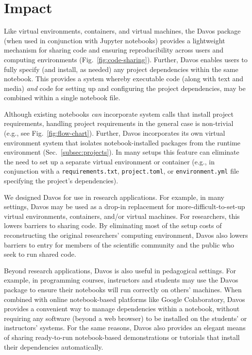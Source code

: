 \documentclass[preprint,12pt,a4paper]{elsarticle}
\begin{document}
\section{Impact}

Like virtual environments, containers, and virtual machines, the
Davos package (when used in conjunction with Jupyter
notebooks) provides a light\-weight mechanism for sharing code and
ensuring reproducibility across users and computing environments
(Fig.~\ref{fig:code-sharing}). Further, Davos enables users
to fully specify (and install, as needed) any project dependencies
within the same notebook. This provides a system whereby executable
code (along with text and media) \textit{and} code for setting up and
configuring the project dependencies, may be combined within a single
notebook file.

Although existing notebooks \textit{can} incorporate system calls that install
project requirements, handling project requirements in the general case is
non-trivial (e.g., see Fig.~\ref{fig:flow-chart}). Further, Davos
incorporates its own virtual environment system that isolates
notebook-installed packages from the runtime environment
(Sec.~\ref{subsec:projects}). In many setups this feature can eliminate the
need to set up a separate virtual environment or container (e.g., in
conjunction with a \texttt{requirements.txt}, \texttt{project.toml}, or
\texttt{environment.yml} file specifying the project's dependencies).

We designed Davos for use in research applications. For
example, in many settings, Davos may be used as a drop-in
replacement for more-difficult-to-set-up virtual environments,
containers, and/or virtual machines. For researchers, this lowers
barriers to sharing code. By eliminating most of the setup costs of
reconstructing the original researchers' computing environment,
Davos also lowers barriers to entry for members of the
scientific community and the public who seek to run shared code.

Beyond research applications, Davos is also useful in
pedagogical settings. For example, in programming courses, instructors
and students may use the Davos package to ensure their
notebooks will run correctly on others' machines. When combined with
online notebook-based platforms like Google Colaboratory,
Davos provides a convenient way to manage dependencies within
a notebook, without requiring any software (beyond a web browser) to
be installed on the students' or instructors' systems. For the same
reasons, Davos also provides an elegant means of sharing
ready-to-run notebook-based demonstrations or tutorials that install
their dependencies automatically.
\end{document}
